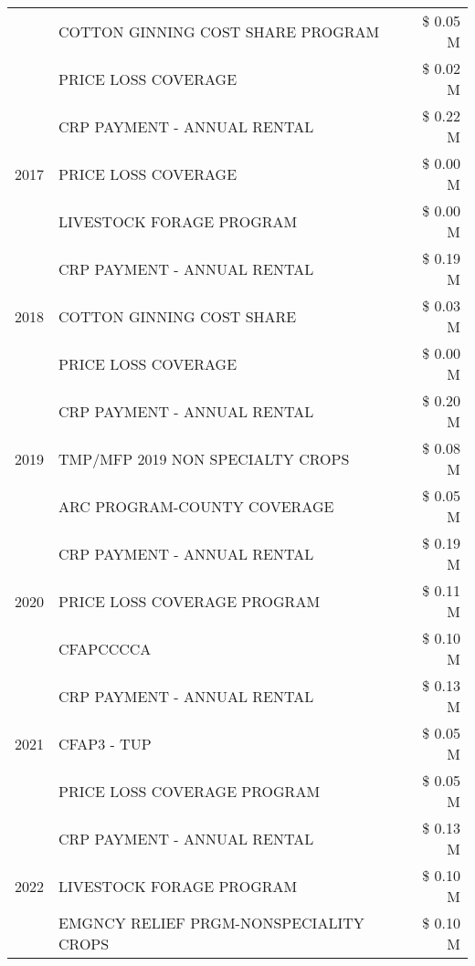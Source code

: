 \begin{tabular}{llr}
 & COTTON GINNING COST SHARE PROGRAM & \$ 0.05 M \\
 & PRICE LOSS COVERAGE & \$ 0.02 M \\
\cline{1-3}
\multirow[t]{3}{*}{2017} & CRP PAYMENT - ANNUAL RENTAL & \$ 0.22 M \\
 & PRICE LOSS COVERAGE & \$ 0.00 M \\
 & LIVESTOCK FORAGE PROGRAM & \$ 0.00 M \\
\cline{1-3}
\multirow[t]{3}{*}{2018} & CRP PAYMENT - ANNUAL RENTAL & \$ 0.19 M \\
 & COTTON GINNING COST SHARE & \$ 0.03 M \\
 & PRICE LOSS COVERAGE & \$ 0.00 M \\
\cline{1-3}
\multirow[t]{3}{*}{2019} & CRP PAYMENT - ANNUAL RENTAL & \$ 0.20 M \\
 & TMP/MFP 2019 NON SPECIALTY CROPS & \$ 0.08 M \\
 & ARC PROGRAM-COUNTY COVERAGE & \$ 0.05 M \\
\cline{1-3}
\multirow[t]{3}{*}{2020} & CRP PAYMENT - ANNUAL RENTAL & \$ 0.19 M \\
 & PRICE LOSS COVERAGE PROGRAM & \$ 0.11 M \\
 & CFAPCCCCA & \$ 0.10 M \\
\cline{1-3}
\multirow[t]{3}{*}{2021} & CRP PAYMENT - ANNUAL RENTAL & \$ 0.13 M \\
 & CFAP3 - TUP & \$ 0.05 M \\
 & PRICE LOSS COVERAGE PROGRAM & \$ 0.05 M \\
\cline{1-3}
\multirow[t]{3}{*}{2022} & CRP PAYMENT - ANNUAL RENTAL & \$ 0.13 M \\
 & LIVESTOCK FORAGE PROGRAM & \$ 0.10 M \\
 & EMGNCY RELIEF PRGM-NONSPECIALITY CROPS & \$ 0.10 M \\
\cline{1-3}
\bottomrule
\end{tabular}
